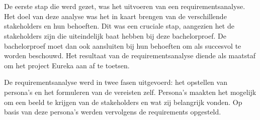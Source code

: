 
\chapter{}%
\label{ch:methodologie}

 
\section{}%
\label{sec:requirement-analyse-meth}

De eerste stap die werd gezet, was het uitvoeren van een requirementsanalyse. Het doel van deze analyse was het in kaart brengen van de verschillende stakeholders en hun behoeften. Dit was een cruciale stap, aangezien het de stakeholders zijn die uiteindelijk baat hebben bij deze bachelorproef. De bachelorproef moet dan ook aansluiten bij hun behoeften om als succesvol te worden beschouwd. Het resultaat van de requirementsanalyse diende als maatstaf om het project Eureka aan af te toetsen.

De requirementsanalyse werd in twee fasen uitgevoerd: het opstellen van persona’s en het formuleren van de vereisten zelf. Persona’s maakten het mogelijk om een beeld te krijgen van de stakeholders en wat zij belangrijk vonden. Op basis van deze persona’s werden vervolgens de requirements opgesteld.

